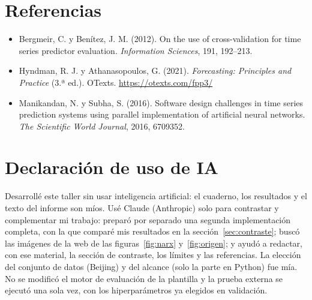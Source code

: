 \documentclass[11pt,letterpaper]{article}
\begin{document}
\section*{Referencias}

\begin{itemize}[leftmargin=*,itemsep=2pt]
\item Bergmeir, C. y Benítez, J. M. (2012). On the use of cross-validation for time series predictor evaluation. \textit{Information Sciences}, 191, 192--213.
\item Hyndman, R. J. y Athanasopoulos, G. (2021). \textit{Forecasting: Principles and Practice} (3.ª ed.). OTexts. \url{https://otexts.com/fpp3/}
\item Manikandan, N. y Subha, S. (2016). Software design challenges in time series prediction systems using parallel implementation of artificial neural networks. \textit{The Scientific World Journal}, 2016, 6709352.
\end{itemize}

\section{Declaración de uso de IA}\label{sec:ia}

Desarrollé este taller sin usar inteligencia artificial: el cuaderno, los resultados y el texto del informe son míos. Usé Claude (Anthropic) solo para contrastar y complementar mi trabajo: preparó por separado una segunda implementación completa, con la que comparé mis resultados en la sección~\ref{sec:contraste}; buscó las imágenes de la web de las figuras~\ref{fig:narx} y~\ref{fig:origen}; y ayudó a redactar, con ese material, la sección de contraste, los límites y las referencias. La elección del conjunto de datos (Beijing) y del alcance (solo la parte en Python) fue mía. No se modificó el motor de evaluación de la plantilla y la prueba externa se ejecutó una sola vez, con los hiperparámetros ya elegidos en validación.
\end{document}
